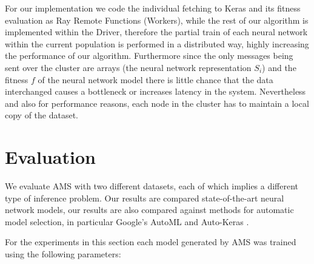 \documentclass[journal]{IEEEtran}
\begin{document}
For our implementation we code the individual fetching to Keras and its fitness evaluation as Ray Remote Functions (Workers), while the rest of our algorithm is implemented within the Driver, therefore the partial train of each neural network within the current population is performed in a distributed way, highly increasing the performance of our algorithm. Furthermore since the only messages being sent over the cluster are arrays (the neural network representation $S_i$) and the fitness $f$ of the neural network model there is little chance that the data interchanged causes a bottleneck or increases latency in the system. Nevertheless and also for performance reasons, each node in the cluster has to maintain a local copy of the dataset.

\section{Evaluation}
\label{sec:evaluation}

We evaluate AMS with two different datasets, each of which implies a different type of inference problem. Our results are compared state-of-the-art neural network models, our results are also compared against methods for automatic model selection, in particular Google's AutoML \cite{AutoML2017} and Auto-Keras \cite{AutoKeras2018}.

For the experiments in this section each model generated by AMS was trained using the following parameters:

\begin{table}[!htb]
\begin{center}
\end{center}
\caption{Training parameters for each of the used datasets.}
\label{table:training_params}
\end{table}
\end{document}
